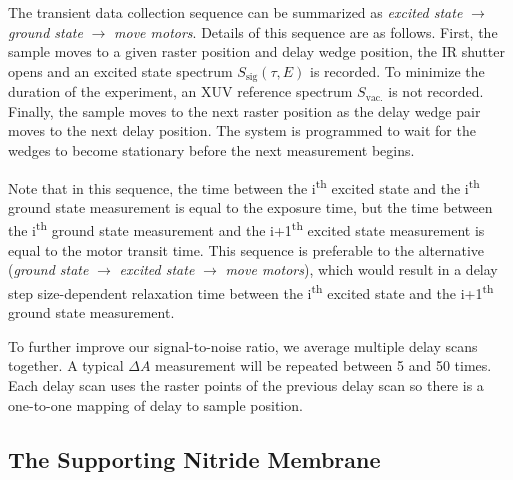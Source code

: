 The transient data collection sequence can be summarized as \textit{excited state} $\rightarrow$ \textit{ground state} $\rightarrow$ \textit{move motors}. Details of this sequence are as follows. First, the sample moves to a given raster position and delay wedge position, the IR shutter opens and an excited state spectrum $S_{\textrm{sig}}(\tau, E)$ is recorded. To minimize the duration of the experiment, an XUV reference spectrum $S_{\textrm{vac.}}$ is not recorded. Finally, the sample moves to the next raster position as the delay wedge pair moves to the next delay position. The system is programmed to wait for the wedges to become stationary before the next measurement begins.

Note that in this sequence, the time between the i\textsuperscript{th} excited state and the i\textsuperscript{th} ground state measurement is equal to the exposure time, but the time between the i\textsuperscript{th} ground state measurement and the i+1\textsuperscript{th} excited state measurement is equal to the motor transit time. This sequence is preferable to the alternative (\textit{ground state} $\rightarrow$ \textit{excited state} $\rightarrow$ \textit{move motors}), which would result in a delay step size-dependent relaxation time between the i\textsuperscript{th} excited state and the i+1\textsuperscript{th} ground state measurement.

To further improve our signal-to-noise ratio, we average multiple delay scans together. A typical $\Delta A$ measurement will be repeated between 5 and 50 times. Each delay scan uses the raster points of the previous delay scan so there is a one-to-one mapping of delay to sample position.

\subsection{The Supporting Nitride Membrane}

